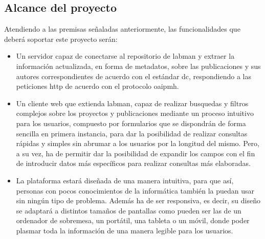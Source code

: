 \subsection{Alcance del proyecto}

Atendiendo a las premisas señaladas anteriormente, las funcionalidades que deberá soportar este proyecto serán:

\begin{itemize}
	\item Un servidor capaz de conectarse al repositorio de \acrshort{labman} y extraer la información actualizada, en forma de metadatos, sobre las publicaciones y sus autores correspondientes de acuerdo con el estándar \acrlong{dc}\cite{DC}, respondiendo a las peticiones \acrshort{http} de acuerdo con el protocolo \acrshort{oaipmh}.
	
	\item Un cliente web que extienda \acrshort{labman}, capaz de realizar busquedas y filtros complejos sobre los proyectos y publicaciones mediante un proceso intuitivo para los usuarios, compuesto por formularios que se dispondrán de forma sencilla en primera instancia, para dar la posibilidad de realizar consultas rápidas y simples sin abrumar a los usuarios por la longitud del mismo. Pero, a su vez, ha de permitir dar la posibilidad de expandir los campos con el fin de introducir datos más específicos para realizar consultas más elaboradas.

	\item La plataforma estará diseñada de una manera intuitiva, para que así, personas con pocos conocimientos de la informática también la puedan usar sin ningún tipo de problema. Además ha de ser responsiva, es decir, su diseño se adaptará a distintos tamaños de pantallas como pueden ser las de un ordenador de sobremesa, un portátil, una tableta o un móvil, donde poder plasmar toda la información de una manera legible para los usuarios.
\end{itemize}